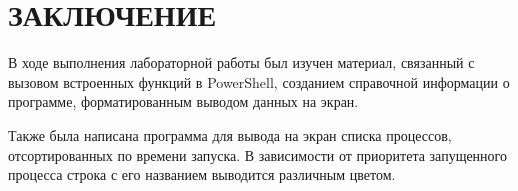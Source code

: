 \section*{ЗАКЛЮЧЕНИЕ}
В ходе выполнения лабораторной работы был изучен материал, связанный с вызовом встроенных функций в
PowerShell, созданием справочной информации о программе, форматированным выводом данных на экран.

Также была написана программа для вывода на экран списка процессов,
отсортированных по времени запуска. В зависимости от приоритета запущенного процесса
строка с его названием выводится различным цветом.

\newpage
